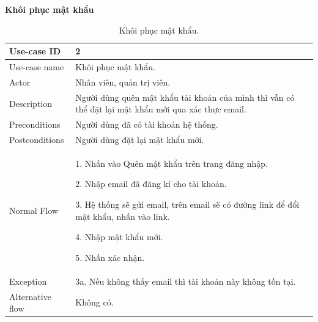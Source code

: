\textbf{Khôi phục mật khẩu}
\begin{table}[!htp]
    \centering
    \begin{tabular}{|m{3cm}|m{10cm}|}
    \hline 
        Use-case ID & 2\\ \hline
        Use-case name & Khôi phục mật khẩu.\\ \hline
        Actor & Nhân viên, quản trị viên.\\ \hline
        Description & Người dùng quên mật khẩu tài khoản của mình thì vẫn có thể đặt lại mật khẩu mới qua xác thực email.\\ \hline
        Preconditions & Người dùng đã có tài khoản hệ thống.\\ \hline
        Postconditions & Người dùng đặt lại mật khẩu mới.\\ \hline
        Normal Flow & 
        1. Nhấn vào Quên mật khẩu trên trang đăng nhập.\par
        2. Nhập email đã đăng kí cho tài khoản.\par
        3. Hệ thống sẽ gửi email, trên email sẽ có đường link để đổi mật khẩu, nhấn vào link.\par
        4. Nhập mật khẩu mới.\par
        5. Nhấn xác nhận.
        \\ \hline
        Exception & 3a. Nếu không thấy email thì tài khoản này không tồn tại.\\ \hline
        Alternative flow & Không có.\\ 
    \hline 
    \end{tabular}
    \caption{Khôi phục mật khẩu.}
    \label{bang2}
\end{table}

